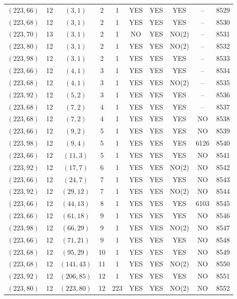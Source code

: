 \begin{longtable}{|c|c|c|c|c|c|c|c|c|c|}
$(223, 66)$ & 12 & $(3, 1)$ & 2 & 1 & YES & YES & YES & -- & 8529\\
$(223, 68)$ & 12 & $(3, 1)$ & 2 & 1 & YES & YES & YES & -- & 8530\\
$(223, 70)$ & 13 & $(3, 1)$ & 2 & 1 & NO & YES & NO(2) & -- & 8531\\
$(223, 80)$ & 12 & $(3, 1)$ & 2 & 1 & YES & YES & NO(2) & -- & 8532\\
$(223, 98)$ & 12 & $(3, 1)$ & 2 & 1 & YES & YES & YES & -- & 8533\\
$(223, 66)$ & 12 & $(4, 1)$ & 3 & 1 & YES & YES & YES & -- & 8534\\
$(223, 68)$ & 12 & $(4, 1)$ & 3 & 1 & YES & YES & NO(2) & -- & 8535\\
$(223, 92)$ & 12 & $(5, 2)$ & 3 & 1 & YES & YES & YES & -- & 8536\\
$(223, 68)$ & 12 & $(7, 2)$ & 4 & 1 & YES & YES & YES & -- & 8537\\
$(223, 68)$ & 12 & $(7, 2)$ & 4 & 1 & YES & YES & YES & NO & 8538\\
$(223, 66)$ & 12 & $(9, 2)$ & 5 & 1 & YES & YES & YES & NO & 8539\\
$(223, 98)$ & 12 & $(9, 4)$ & 5 & 1 & YES & YES & YES & 6126 & 8540\\
$(223, 66)$ & 12 & $(11, 3)$ & 5 & 1 & YES & YES & YES & NO & 8541\\
$(223, 92)$ & 12 & $(17, 7)$ & 6 & 1 & YES & YES & NO(2) & NO & 8542\\
$(223, 66)$ & 12 & $(24, 7)$ & 7 & 1 & YES & YES & YES & NO & 8543\\
$(223, 92)$ & 12 & $(29, 12)$ & 7 & 1 & YES & YES & NO(2) & NO & 8544\\
$(223, 66)$ & 12 & $(44, 13)$ & 8 & 1 & YES & YES & YES & 6103 & 8545\\
$(223, 66)$ & 12 & $(61, 18)$ & 9 & 1 & YES & YES & YES & NO & 8546\\
$(223, 98)$ & 12 & $(66, 29)$ & 9 & 1 & YES & YES & NO(2) & NO & 8547\\
$(223, 66)$ & 12 & $(71, 21)$ & 9 & 1 & YES & YES & YES & NO & 8548\\
$(223, 68)$ & 12 & $(95, 29)$ & 10 & 1 & YES & YES & YES & NO & 8549\\
$(223, 68)$ & 12 & $(141, 43)$ & 11 & 1 & YES & YES & NO(2) & NO & 8550\\
$(223, 92)$ & 12 & $(206, 85)$ & 12 & 1 & YES & YES & YES & NO & 8551\\
$(223, 80)$ & 12 & $(223, 80)$ & 12 & 223 & YES & YES & NO(2) & NO & 8552\\

\end{longtable}
